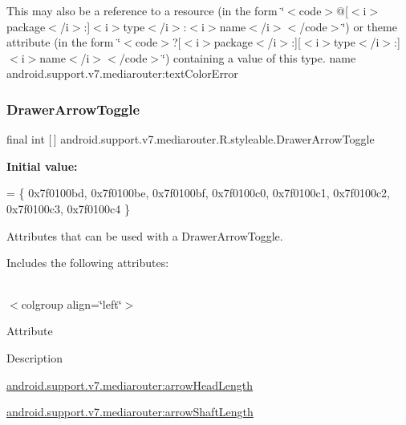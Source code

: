 This may also be a reference to a resource (in the form \char`\"{}$<$code$>$@\mbox{[}$<$i$>$package$<$/i$>$\+:\mbox{]}$<$i$>$type$<$/i$>$\+:$<$i$>$name$<$/i$>$$<$/code$>$\char`\"{}) or theme attribute (in the form \char`\"{}$<$code$>$?\mbox{[}$<$i$>$package$<$/i$>$\+:\mbox{]}\mbox{[}$<$i$>$type$<$/i$>$\+:\mbox{]}$<$i$>$name$<$/i$>$$<$/code$>$\char`\"{}) containing a value of this type.  name android.\+support.\+v7.\+mediarouter\+:text\+Color\+Error \mbox{\label{classandroid_1_1support_1_1v7_1_1mediarouter_1_1R_1_1styleable_a71030bdd9f81aafe32f56767ba04e5b0}} 
\subsubsection{\texorpdfstring{Drawer\+Arrow\+Toggle}{DrawerArrowToggle}}
{\footnotesize\ttfamily final int \mbox{[}$\,$\mbox{]} android.\+support.\+v7.\+mediarouter.\+R.\+styleable.\+Drawer\+Arrow\+Toggle\hspace{0.3cm}{\ttfamily [static]}}

{\bfseries Initial value\+:}
\begin{DoxyCode}
= \{
            0x7f0100bd, 0x7f0100be, 0x7f0100bf, 0x7f0100c0,
            0x7f0100c1, 0x7f0100c2, 0x7f0100c3, 0x7f0100c4
        \}
\end{DoxyCode}
Attributes that can be used with a Drawer\+Arrow\+Toggle. 

Includes the following attributes\+:

\tabulinesep=1mm
\begin{longtabu} spread 0pt [c]{*{0}{|X[-1]}|}
\hline
\end{longtabu}
$<$colgroup align=\char`\"{}left\char`\"{}$>$ 

Attribute

Description 

{\ttfamily \hyperlink{classandroid_1_1support_1_1v7_1_1mediarouter_1_1R_1_1styleable_a54583b5b62def598121ead1148201937}{android.\+support.\+v7.\+mediarouter\+:arrow\+Head\+Length}}

{\ttfamily \hyperlink{classandroid_1_1support_1_1v7_1_1mediarouter_1_1R_1_1styleable_a0372ce9b69df23ee04c3dbddd6e5ddd3}{android.\+support.\+v7.\+mediarouter\+:arrow\+Shaft\+Length}}

